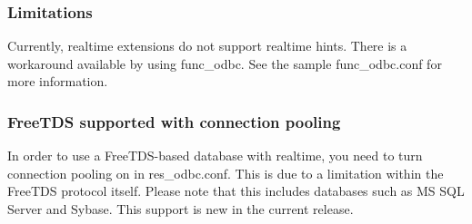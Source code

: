 \subsubsection{Limitations}

Currently, realtime extensions do not support realtime hints.  There is
a workaround available by using func\_odbc.  See the sample func\_odbc.conf
for more information.

\subsubsection{FreeTDS supported with connection pooling}

In order to use a FreeTDS-based database with realtime, you need to turn
connection pooling on in res\_odbc.conf.  This is due to a limitation within
the FreeTDS protocol itself.  Please note that this includes databases such
as MS SQL Server and Sybase.  This support is new in the current release.
